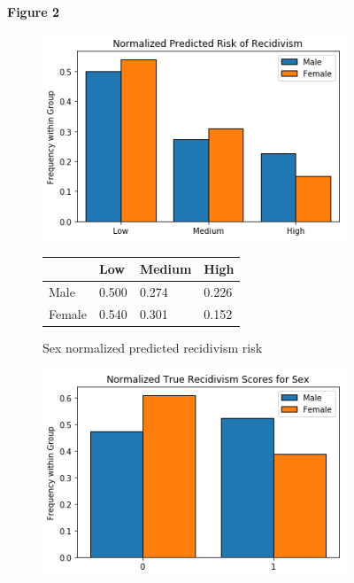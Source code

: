 \documentclass[11pt, fleqn, titlepage]{article}
\begin{document}
	\begin{figure}[H]
		\centering
		\textbf{\textbf{Figure 2}}\par\medskip		
		\begin{subfigure}{0.5\textwidth}
			\centering
			\includegraphics[width=0.9\linewidth]{"imgs/normalized_recid_sex"}
			\begin{table}[H]
				\centering
				\begin{tabular}{|l|l|l|l|}
					\hline
					& Low   & Medium & High  \\ \hline
					Male      & 0.500 & 0.274  & 0.226 \\ \hline
					Female    & 0.540 & 0.301  & 0.152 \\ \hline
				\end{tabular}
			\end{table}
			\caption{Sex normalized predicted recidivism risk}
			\label{fig:predictedrecidsex}			
		\end{subfigure}%
		\begin{subfigure}{0.5\textwidth}
			\centering
			\includegraphics[width=0.9\linewidth]{"imgs/true_normalized_sex"}

\end{subfigure}
\end{figure}
\end{document}
